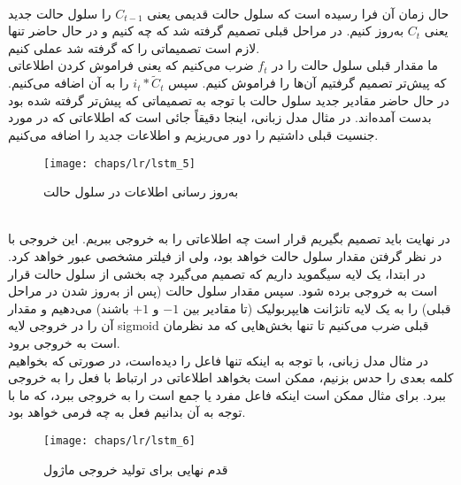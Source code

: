 \\
حال زمان آن فرا رسیده است که سلول حالت قدیمی یعنی $C_{t-1}$ را سلول حالت جدید یعنی $C_t$ به‌روز کنیم. در مراحل قبلی تصمیم گرفته شد که چه کنیم و در حال حاضر تنها لازم است تصمیماتی را که گرفته شد عملی کنیم.
\\
ما مقدار قبلی سلول حالت را در $f_t$ ضرب می‌کنیم که یعنی فراموش کردن اطلاعاتی که پیش‌تر تصمیم گرفتیم آن‌ها را فراموش کنیم. سپس $i_t \ast \tilde{C}_t$ را به آن اضافه می‌کنیم. در حال حاضر مقادیر جدید سلول حالت با توجه به تصمیماتی که پیش‌تر گرفته شده بود بدست آمده‌اند. در مثال مدل زبانی، اینجا دقیقاً جائی است که اطلاعاتی که در مورد جنسیت قبلی داشتیم را دور می‌ریزیم و اطلاعات جدید را اضافه می‌کنیم.
\begin{figure}[!ht]
	\centerline{\texttt{[image: chaps/lr/lstm\_5]}}
	\caption{
		به‌روز رسانی اطلاعات در سلول حالت
	}
	\label{fig:ch_lr:lstm_5}
\end{figure} 
\\
در نهایت باید تصمیم بگیریم قرار است چه اطلاعاتی را به خروجی ببریم. این خروجی با در نظر گرفتن مقدار سلول حالت خواهد بود، ولی از فیلتر مشخصی عبور خواهد کرد. در ابتدا، یک لایه سیگموید داریم که تصمیم می‌گیرد چه بخشی از سلول حالت قرار است به خروجی برده شود. سپس مقدار سلول حالت (پس از به‌روز شدن در مراحل قبلی) را به یک لایه تانژانت هایپربولیک (تا مقادیر بین $-1$ و $+1$ باشند) می‌دهیم و مقدار آن را در خروجی لایه \gls{sigmoid} قبلی ضرب می‌کنیم تا تنها بخش‌هایی که مد نظرمان است به خروجی برود.
\\
در مثال مدل زبانی، با توجه به اینکه تنها فاعل را دیده‌است، در صورتی که بخواهیم کلمه بعدی را حدس بزنیم، ممکن است بخواهد اطلاعاتی در ارتباط با فعل را به خروجی ببرد. برای مثال ممکن است اینکه فاعل مفرد یا جمع است را به خروجی ببرد، که ما با توجه به آن بدانیم فعل به چه فرمی خواهد بود.
\begin{figure}[!ht]
	\centerline{\texttt{[image: chaps/lr/lstm\_6]}}
	\caption{
		قدم نهایی برای تولید خروجی ماژول 
	}
	\label{fig:ch_lr:lstm_6}
\end{figure} 

